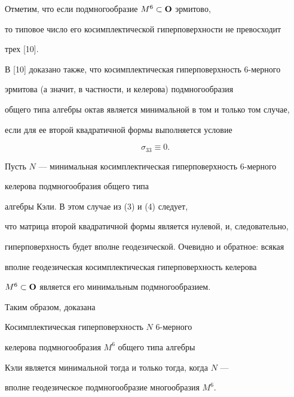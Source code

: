 Отметим, что если подмногообразие $M^6 \subset \bold O$ эрмитово, 


то типовое число его косимплектической гиперповерхности не превосходит


трех [10].





В [10] доказано также, что косимплектическая гиперповерхность 6-мерного


эрмитова (а значит, в частности, и келерова) подмногообразия


общего типа алгебры октав является минимальной в том и только том случае,


если для ее второй квадратичной формы выполняется условие


\begin{equation}


\sigma_{33}\equiv 0.


\end{equation}





Пусть $N$ --- минимальная косимплектическая гиперповерхность 6-мерного


келерова подмногообразия общего типа


алгебры Кэли. В этом случае из (3) и (4) следует,


что матрица второй квадратичной формы является нулевой, и, следовательно, 


гиперповерхность будет вполне геодезической. Очевидно и обратное: всякая


вполне геодезическая косимплектическая гиперповерхность келерова 


$M^6 \subset \bold O$ является его минимальным подмногообразием. 





Таким образом, доказана








\begin{thm}


Косимплектическая гиперповерхность $N$ $6$-мерного


келерова подмногообразия $M^6$ общего типа алгебры 


Кэли является минимальной тогда и только тогда, когда $N$ --- 


вполне геодезическое подмногообразие многообразия $M^6$.


\end{thm}





